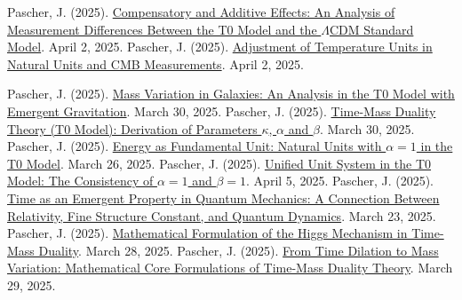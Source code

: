 \documentclass[12pt,a4paper]{article}
\begin{document}
	\begin{thebibliography}{99}
		 Pascher, J. (2025). \href{https://github.com/jpascher/T0-Time-Mass-Duality/tree/main/2/pdf/English/MessdifferenzenT0StandardEn.pdf}{Compensatory and Additive Effects: An Analysis of Measurement Differences Between the T0 Model and the \(\Lambda\)CDM Standard Model}. April 2, 2025.
		 Pascher, J. (2025). \href{https://github.com/jpascher/T0-Time-Mass-Duality/tree/main/2/pdf/English/TempEinheitenCMBEn.pdf}{Adjustment of Temperature Units in Natural Units and CMB Measurements}. April 2, 2025.
		
		
		
		
		 Pascher, J. (2025). \href{https://github.com/jpascher/T0-Time-Mass-Duality/tree/main/2/pdf/English/MassVarGalaxienEn.pdf}{Mass Variation in Galaxies: An Analysis in the T0 Model with Emergent Gravitation}. March 30, 2025.
		 Pascher, J. (2025). \href{https://github.com/jpascher/T0-Time-Mass-Duality/tree/main/2/pdf/English/ZeitMasseT0ParamsEn.pdf}{Time-Mass Duality Theory (T0 Model): Derivation of Parameters \(\kappa\), \(\alpha\) and \(\beta\)}. March 30, 2025.
		 Pascher, J. (2025). \href{https://github.com/jpascher/T0-Time-Mass-Duality/tree/main/2/pdf/English/NatEinheitenAlpha1En.pdf}{Energy as Fundamental Unit: Natural Units with \(\alpha = 1\) in the T0 Model}. March 26, 2025.
		 Pascher, J. (2025). \href{https://github.com/jpascher/T0-Time-Mass-Duality/tree/main/2/pdf/English/Alpha1Beta1KonsistenzEn.pdf}{Unified Unit System in the T0 Model: The Consistency of \(\alpha = 1\) and \(\beta = 1\)}. April 5, 2025.
		 Pascher, J. (2025). \href{https://github.com/jpascher/T0-Time-Mass-Duality/tree/main/2/pdf/English/ZeitEmergentQMEn.pdf}{Time as an Emergent Property in Quantum Mechanics: A Connection Between Relativity, Fine Structure Constant, and Quantum Dynamics}. March 23, 2025.
		 Pascher, J. (2025). \href{https://github.com/jpascher/T0-Time-Mass-Duality/tree/main/2/pdf/English/MathHiggsZeitMasseEn.pdf}{Mathematical Formulation of the Higgs Mechanism in Time-Mass Duality}. March 28, 2025.
		 Pascher, J. (2025). \href{https://github.com/jpascher/T0-Time-Mass-Duality/tree/main/2/pdf/English/MathZeitMasseLagrange.pdf}{From Time Dilation to Mass Variation: Mathematical Core Formulations of Time-Mass Duality Theory}. March 29, 2025.
		

\end{thebibliography}
\end{document}
